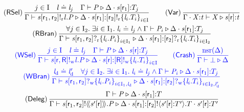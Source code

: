 \begin{figure}[tp]
\[\begin{array}{c}
		\left( \textsf{RSel} \right) \dfrac{j \in \indexSet \quad \Label \compL \Label_j \quad \Gamma \vdash \PT \triangleright \Delta \compS \Typed{\AT{\Chan}{\Role_1}}{\LT_j}}{\Gamma \vdash \PSelR{\Chan}{\Role_1}{\Role_2}{\Label}{\PT} \triangleright \Delta \compS \Typed{\AT{\Chan}{\Role_1}}{\LSelR{\Role_2}{\Set{ \Label_i.\LT_i }_{i \in \indexSet}}}} \hspace{2em}
		\left( \textsf{Var} \right) \dfrac{}{\Gamma \compS \Typed{\ProcV}{\TypeV} \vdash \ProcV \triangleright \Typed{\AT{\Chan}{\Role}}{\TypeV}} \vspace{0.5em}\\
		\left( \textsf{RBran} \right) \dfrac{\forall j \in \indexSet_2\logdot \exists i \in \indexSet_1\logdot \Label_i \compL \Label_j \wedge \Gamma \vdash \PT_i \triangleright \Delta \compS \Typed{\AT{\Chan}{\Role_1}}{\LT_j}}{\Gamma \vdash \PBranR{\Chan}{\Role_1}{\Role_2}{\Set{ \Label_i.\PT_i }_{i \in \indexSet_1}} \triangleright \Delta \compS \Typed{\AT{\Chan}{\Role_1}}{\LBranR{\Role_2}{\Set{ \Label_i.\LT_i }_{i \in \indexSet_2}}}} \vspace{0.5em}\\
		\textcolor{blue}{\left( \textsf{WSel} \right) \dfrac{j \in \indexSet \quad \Label \compL \Label_j \quad \Gamma \vdash \PT \triangleright \Delta \compS \Typed{\AT{\Chan}{\Role}}{\LT_j}}{\Gamma \vdash \PSelW{\Chan}{\Role}{\Role[R]}{\Label}{\PT} \triangleright \Delta \compS \Typed{\AT{\Chan}{\Role}}{\LSelW{\Role[R]}{\Set{ \Label_i.\LT_i }_{i \in \indexSet}}}}} \hspace{2em}
		\textcolor{blue}{\left( \textsf{Crash} \right) \dfrac{\Unreliable{\Delta}}{\Gamma \vdash \PCrash \triangleright \Delta}} \vspace{0.5em}\\
		\textcolor{blue}{\left( \textsf{WBran} \right) \dfrac{\LabelD \compL \LabelD' \quad \forall j \in \indexSet_2\logdot \exists i \in \indexSet_1\logdot \Label_i \compL \Label_j \wedge \Gamma \vdash \PT_i \triangleright \Delta \compS \Typed{\AT{\Chan}{\Role_1}}{\LT_j}}{\Gamma \vdash \PBranW{\Chan}{\Role_1}{\Role_2}{\Set{ \Label_i.\PT_i }_{i \in \indexSet_1, \LabelD}} \triangleright \Delta \compS \Typed{\AT{\Chan}{\Role_1}}{\LBranW{\Role_2}{\Set{ \Label_i.\LT_i }_{i \in \indexSet_2, \LabelD'}}}}} \vspace{0.5em}\\
		\left( \textsf{Deleg} \right) \dfrac{\Gamma \vdash \PT \triangleright \Delta \compS \Typed{\AT{\Chan}{\Role_1}}{\LT}}{\Gamma \vdash \PDelA{\Chan}{\Role_1}{\Role_2}{\AT{\Chan'}{\Role}}{\PT} \triangleright \Delta \compS \Typed{\AT{\Chan}{\Role_1}}{\LDelA{\Role_2}{\Chan'}{\Role}{\LT'}{\LT}} \compS \Typed{\AT{\Chan'}{\Role}}{\LT'}} \vspace{0.5em}\\

\end{array}\]
\end{figure}
